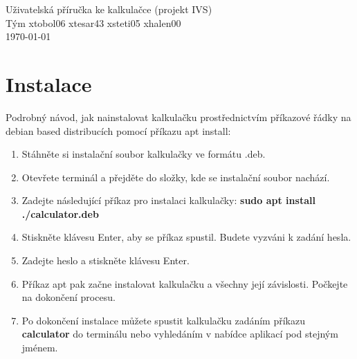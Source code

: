 \documentclass[a4paper, 11pt]{article}
\begin{document}
    \begin{center}
        \LARGE Uživatelská příručka ke kalkulačce (projekt IVS)\\[0.4em]

        \Large Tým xtobol06 xtesar43 xsteti05 xhalen00\\[0.4em]

        \Large \today
    \end{center}

    \tableofcontents
    \newpage

    \section{Instalace}
    Podrobný návod, jak nainstalovat kalkulačku prostřednictvím příkazové řádky na debian based distribucích pomocí příkazu apt install:
    \begin{enumerate}
        \item Stáhněte si instalační soubor kalkulačky ve formátu .deb.    
        \item Otevřete terminál a přejděte do složky, kde se instalační soubor nachází.
        \item Zadejte následující příkaz pro instalaci kalkulačky: 
         \textbf{sudo apt install ./calculator.deb}
        \item Stiskněte klávesu Enter, aby se příkaz spustil. Budete vyzváni k zadání hesla.
        \item Zadejte heslo a stiskněte klávesu Enter.
        \item Příkaz apt pak začne instalovat kalkulačku a všechny její závislosti. Počkejte na dokončení procesu.
        \item Po dokončení instalace můžete spustit kalkulačku zadáním příkazu \textbf{calculator} do terminálu nebo vyhledáním v nabídce aplikací pod stejným jménem.
    \end{enumerate}
\end{document}
